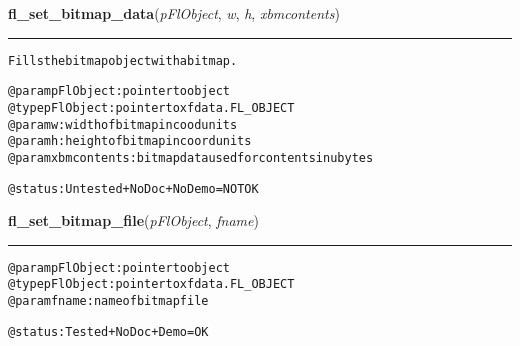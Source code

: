     \label{xformslib:flbitmap:fl_set_bitmap_data}

    \vspace{0.5ex}

\hspace{.8\funcindent}\begin{boxedminipage}{\funcwidth}

    \raggedright \textbf{fl\_set\_bitmap\_data}(\textit{pFlObject}, \textit{w}, \textit{h}, \textit{xbmcontents})

    \vspace{-1.5ex}

    \rule{\textwidth}{0.5\fboxrule}
\setlength{\parskip}{2ex}
\begin{alltt}
        Fills the bitmap object with a bitmap.

        @param pFlObject: pointer to object
@type pFlObject: pointer to xfdata.FL\_OBJECT
        @param w: width of bitmap in cood units
        @param h: height of bitmap in coord units
        @param xbmcontents: bitmap data used for contents in ubytes

        @status: Untested + NoDoc + NoDemo = NOT OK
    
\end{alltt}

\setlength{\parskip}{1ex}
    \end{boxedminipage}

    \label{xformslib:flbitmap:fl_set_bitmap_file}

    \vspace{0.5ex}

\hspace{.8\funcindent}\begin{boxedminipage}{\funcwidth}

    \raggedright \textbf{fl\_set\_bitmap\_file}(\textit{pFlObject}, \textit{fname})

    \vspace{-1.5ex}

    \rule{\textwidth}{0.5\fboxrule}
\setlength{\parskip}{2ex}
\begin{alltt}
        @param pFlObject: pointer to object
@type pFlObject: pointer to xfdata.FL\_OBJECT
        @param fname: name of bitmap file

        @status: Tested + NoDoc + Demo = OK
    
\end{alltt}

\setlength{\parskip}{1ex}
    \end{boxedminipage}

